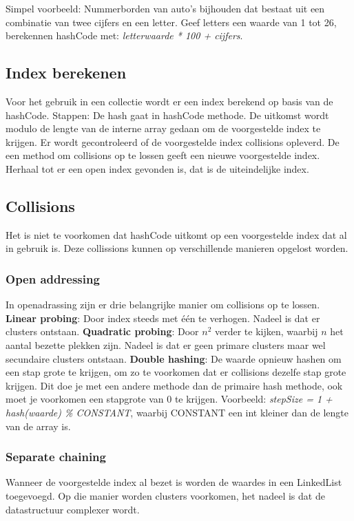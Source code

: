 Simpel voorbeeld:
Nummerborden van auto's bijhouden dat bestaat uit een combinatie van twee cijfers en een letter.
Geef letters een waarde van 1 tot 26, berekennen hashCode met: \textit{letterwaarde * 100 + cijfers}.

\subsection{Index berekenen}
Voor het gebruik in een collectie wordt er een index berekend op basis van de hashCode.
Stappen:
De hash gaat in hashCode methode.
De uitkomst wordt modulo de lengte van de interne array gedaan om de voorgestelde index te krijgen.
Er wordt gecontroleerd of de voorgestelde index collisions opleverd.
De een method om collisions op te lossen geeft een nieuwe voorgestelde index.
Herhaal tot er een open index gevonden is, dat is de uiteindelijke index.

\subsection{Collisions}
Het is niet te voorkomen dat hashCode uitkomt op een voorgestelde index dat al in gebruik is. 
Deze collissions kunnen op verschillende manieren opgelost worden.

\subsubsection{Open addressing}
In openadrassing zijn er drie belangrijke manier om collisions op te lossen.
\textbf{Linear probing}: Door index steeds met \'e\'en te verhogen.
Nadeel is dat er clusters ontstaan.
\textbf{Quadratic probing}: Door $n^2$ verder te kijken, waarbij $n$ het aantal bezette plekken zijn.
Nadeel is dat er geen primare clusters maar wel secundaire clusters ontstaan.
\textbf{Double hashing}: De waarde opnieuw hashen om een stap grote te krijgen, om zo te voorkomen dat er collisions dezelfe stap grote krijgen.
Dit doe je met een andere methode dan de primaire hash methode, ook moet je voorkomen een stapgrote van 0 te krijgen.
Voorbeeld: \textit{stepSize = 1 + hash(waarde) \% CONSTANT}, waarbij CONSTANT een int kleiner dan de lengte van de array is.

\subsubsection{Separate chaining}
Wanneer de voorgestelde index al bezet is worden de waardes in een LinkedList toegevoegd.
Op die manier worden clusters voorkomen, het nadeel is dat de datastructuur complexer wordt.
